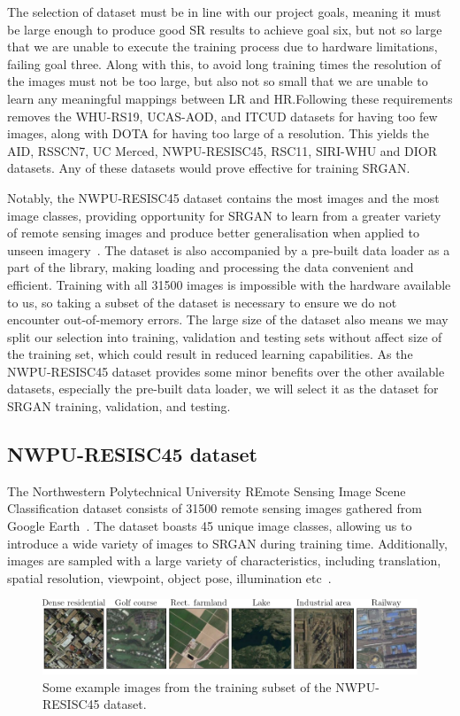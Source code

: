 The selection of dataset must be in line with our project goals, meaning it must be large enough to produce good SR results to achieve goal six, but not so large that we are unable to execute the training process due to hardware limitations, failing goal three. Along with this, to avoid long training times the resolution of the images must not be too large, but also not so small that we are unable to learn any meaningful mappings between LR and HR.\@  Following these requirements removes the WHU-RS19, UCAS-AOD, and ITCUD datasets for having too few images, along with DOTA for having too large of a resolution. This yields the AID, RSSCN7, UC Merced, NWPU-RESISC45, RSC11, SIRI-WHU and DIOR datasets. Any of these datasets would prove effective for training SRGAN.\@

Notably, the NWPU-RESISC45 dataset contains the most images and the most image classes, providing opportunity for SRGAN to learn from a greater variety of remote sensing images and produce better generalisation when applied to unseen imagery~\cite{resisc45}. The dataset is also accompanied by a pre-built data loader as a part of the   library, making loading and processing the data convenient and efficient. Training with all 31500 images is impossible with the hardware available to us, so taking a subset of the dataset is necessary to ensure we do not encounter out-of-memory errors. The large size of the dataset also means we may split our selection into training, validation and testing sets without affect size of the training set, which could result in reduced learning capabilities. As the NWPU-RESISC45 dataset provides some minor benefits over the other available datasets, especially the pre-built data loader, we will select it as the dataset for SRGAN training, validation, and testing. 

\subsection{NWPU-RESISC45 dataset}\label{subsec:resisc45}
The Northwestern Polytechnical University REmote Sensing Image Scene Classification dataset consists of 31500 remote sensing images gathered from Google Earth~\cite{resisc45}. The dataset boasts 45 unique image classes, allowing us to introduce a wide variety of images to SRGAN during training time. Additionally, images are sampled with a large variety of characteristics, including translation, spatial resolution, viewpoint, object pose, illumination etc~\cite{resisc45}.
\begin{figure}[b]
    \includegraphics[width=\linewidth]{./assets/resisc45_example.png}
    \caption{Some example images from the training subset of the NWPU-RESISC45 dataset.}
    \label{fig:resisc45_examples}
\end{figure}

